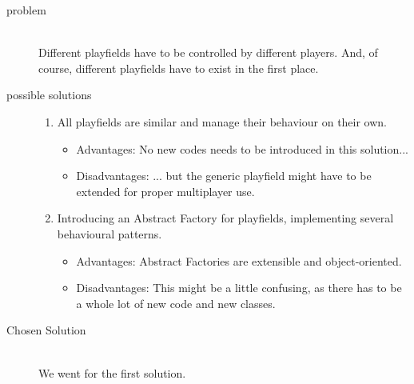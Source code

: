 \begin{description}
  \item[problem] ~\\ \hfill
    Different playfields have to be controlled by different players. And, of course, different playfields have to exist in the first place.
  \item[possible solutions] \hfill

    \begin{enumerate}
      \item All playfields are similar and manage their behaviour on their own.
      \begin{itemize}
        \item Advantages: No new codes needs to be introduced in this solution...
        \item Disadvantages: ... but the generic playfield might have to be extended for proper multiplayer use.
      \end{itemize}

      \item Introducing an Abstract Factory for playfields, implementing several behavioural patterns.
      \begin{itemize}
        \item Advantages: Abstract Factories are extensible and object-oriented.
        \item Disadvantages: This might be a little confusing, as there has to be a whole lot of new code and new classes.
      \end{itemize}
    \end{enumerate}

  \item[Chosen Solution] ~\\ \hfill
    We went for the first solution.
  \\
%
\end{description}